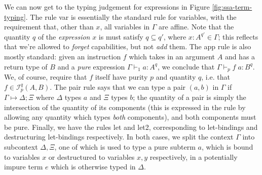 \documentclass[acmsmall,screen,review]{acmart}
\newcommand{\mc}[1]{\ensuremath{\mathcal{#1}}}
\newcommand{\csplits}[3]{#1 \mapsto #2;#3}
\newcommand{\rle}[1]{{\scriptsize\textsf{#1}}}
\newcommand{\hasty}[5]{#1 \vdash_{#2} #3: {#4}^{#5}}
\begin{document}
We can now get to the typing judgement for expressions in Figure
\ref{fig:ssa-term-typing}. The rule \rle{var} is essentially the standard rule
for variables, with the requirement that, other than \(x\), all variables in
\(\Gamma\) are affine. Note that the quantity \(q\) of the \textit{expression}
\(x\) is must satisfy \(q \subseteq q'\), where \(x: A^{q'} \in \Gamma\); this
reflects that we're allowed to \textit{forget} capabilities, but not
\textit{add} them. The \rle{app} rule is also mostly standard: given an
instruction \(f\) which takes in an argument \(A\) and has a return type of
\(B\) and a \textit{pure} expression \(\hasty{\Gamma}{1}{a}{A}{q}\), we conclude
that \(\hasty{\Gamma}{p}{f\;a}{B}{q}\). We, of course, require that \(f\) itself
have purity \(p\) and quantity \(q\), i.e. that \(f \in \mc{I}_p^q(A, B)\). The
\rle{pair} rule says that we can type a pair \((a, b)\) in \(\Gamma\) if
\(\csplits{\Gamma}{\Delta}{\Xi}\) where \(\Delta\) types \(a\) and \(\Xi\) types
\(b\); the quantity of a pair is simply the intersection of the quantity of its
components (this is expressed in the rule by allowing any quantity which types
\textit{both} components), and both components must be pure. Finally, we have
the rules \rle{let} and \rle{let2}, corresponding to let-bindings and
destructuring let-bindings respectively. In both cases, we split the context
\(\Gamma\) into subcontext \(\Delta, \Xi\), one of which is used to type a pure
subterm \(a\), which is bound to variables \(x\) or destructured to variables
\(x, y\) respectively, in a potentially impure term \(e\) which is otherwise
typed in \(\Delta\).
\end{document}
